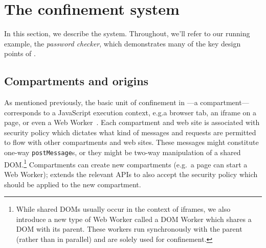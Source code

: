 \section{The \sys{} confinement system}
\label{sec:system}

In this section, we describe the \sys{} system.
%
Throughout, we'll refer to our running example, the \emph{password
checker}, which demonstrates many of the key design points of \sys{}.

\subsection{Compartments and origins}




As mentioned previously, the basic unit of confinement in \sys{}---a
compartment---corresponds to a JavaScript execution context, e.g.\@ a
browser tab, an iframe on a page, or even a Web Worker~\cite{workers}.
%
Each compartment and web site is associated with security policy which
dictates what kind of messages and requests are permitted to flow with
other compartments and web sites.
%
These messages might constitute one-way {\tt postMessage}s, or they might
be two-way manipulation of a shared DOM\@.\footnote{While shared DOMs
usually occur in the context of iframes, we also introduce a new type
of Web Worker called a DOM Worker which shares a DOM with its parent.
These workers run synchronously with the parent (rather than in parallel)
and are solely used for confinement.}
%
Compartments can create new compartments (e.g.\ a page can start a Web
Worker); \sys{} extends the relevant APIs to also accept the security
policy which should be applied to the new compartment.

